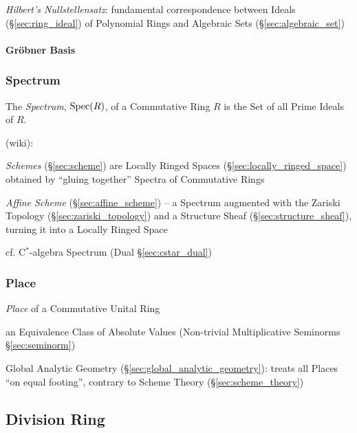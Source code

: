 \emph{Hilbert's Nullstellensatz}: fundamental correspondence between Ideals
(\S\ref{sec:ring_ideal}) of Polynomial Rings and Algebraic Sets
(\S\ref{sec:algebraic_set})



\paragraph{Gr\"obner Basis}\label{sec:grobner_basis}\hfill




\subsubsection{Spectrum}\label{sec:ring_spectrum}

The \emph{Spectrum}, $\mathrm{Spec}(R)$, of a Commutative Ring $R$ is the Set of all
Prime Ideals of $R$.

(wiki):

\fist \emph{Schemes} (\S\ref{sec:scheme}) are Locally Ringed Spaces
(\S\ref{sec:locally_ringed_space}) obtained by ``gluing together'' Spectra of
Commutative Rings

\fist \emph{Affine Scheme} (\S\ref{sec:affine_scheme}) -- a Spectrum augmented
with the Zariski Topology (\S\ref{sec:zariski_topology}) and a Structure Sheaf
(\S\ref{sec:structure_sheaf}), turning it into a Locally Ringed Space

\fist cf. C$^*$-algebra Spectrum (Dual \S\ref{sec:cstar_dual})



\subsubsection{Place}\label{sec:place}

\emph{Place} of a Commutative Unital Ring

an Equivalence Class of Absolute Values (Non-trivial Multiplicative Seminorms
\S\ref{sec:seminorm})

\fist Global Analytic Geometry (\S\ref{sec:global_analytic_geometry}): treats
all Places ``on equal footing'', contrary to Scheme Theory
(\S\ref{sec:scheme_theory})



\subsection{Division Ring}\label{sec:division_ring}

